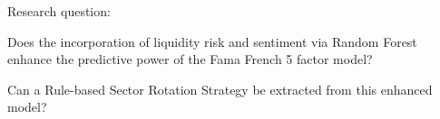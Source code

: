Research question: 

Does the incorporation of liquidity risk and sentiment via Random Forest enhance the predictive power of the Fama French 5 factor model? 

Can a Rule-based Sector Rotation Strategy be extracted from this enhanced model?

